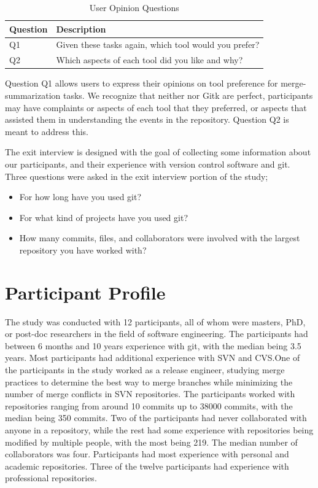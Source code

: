 \begin{table}[htpb]
  \centering
  \caption{User Opinion Questions}
  \label{tab:opinion_questions}
  \begin{tabulary}{0.9\textwidth}{LL}
    \toprule
    Question & Description\\
    \midrule
    Q1 & Given these tasks again, which tool would you prefer?\\
    Q2 & Which aspects of each tool did you like and why?\\
    \bottomrule
  \end{tabulary}
\end{table}

Question Q1 allows users to express their opinions on tool preference
for merge-summarization tasks. We recognize that neither \tool{} nor
Gitk are perfect, participants may have complaints or aspects of each
tool that they preferred, or aspects that assisted them in understanding
the events in the repository. Question Q2 is meant to address this.

The exit interview is designed with the goal of collecting some
information about our participants, and their experience with version
control software and git. Three questions were asked in the exit
interview portion of the study;

\begin{itemize}
  \item For how long have you used git?
  \item For what kind of projects have you used git?
  \item How many commits, files, and collaborators were involved with
    the largest repository you have worked with?
\end{itemize}

\section{Participant Profile}\label{sec:participant_profile}

The study was conducted with 12 participants, all of whom were masters,
PhD, or post-doc researchers in the field of software engineering. The
participants had between 6 months and 10 years experience with git, with
the median being 3.5 years. Most participants had additional experience
with SVN and CVS.\@ One of the participants in the study worked as a
release engineer, studying merge practices to determine the best way to
merge branches while minimizing the number of merge conflicts in SVN
repositories. The participants worked with repositories ranging from
around 10 commits up to 38000 commits, with the median being 350
commits. Two of the participants had never collaborated with anyone in a
repository, while the rest had some experience with repositories being
modified by multiple people, with the most being 219. The median number
of collaborators was four. Participants had most experience with
personal and academic repositories. Three of the twelve participants had
experience with professional repositories.

